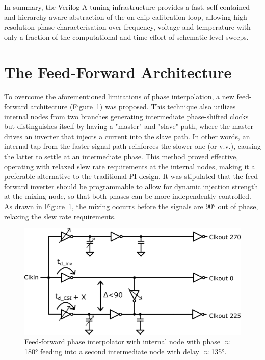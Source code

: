 \vspace{1em}
In summary, the Verilog-A tuning infrastructure provides a fast,
self-contained and hierarchy-aware abstraction of the on-chip calibration loop,
allowing high-resolution phase characterisation over frequency, voltage and
temperature with only a fraction of the computational and time effort of schematic-level
sweeps.

\section{The Feed-Forward Architecture}\label{sec:feedforward}
To overcome the aforementioned limitations of phase interpolation, a new feed-forward architecture (Figure~\ref{fig:FF_half_1}) was proposed. This technique also utilizes internal nodes from two branches generating intermediate phase-shifted clocks but distinguishes itself by having a "master" and "slave" path, where the master drives an inverter that injects a current into the slave path. In other words, an internal tap from the faster signal path reinforces the slower one (or v.v.), causing the latter to settle at an intermediate phase. This method proved effective, operating with relaxed slew rate requirements at the internal nodes, making it a preferable alternative to the traditional PI design. It was stipulated that the feed-forward inverter should be programmable to allow for dynamic injection strength at the mixing node, so that both phases can be more independently controlled. As drawn in Figure~\ref{fig:FF_half_1}, the mixing occurrs before the signals are \ang{90} out of phase, relaxing the slew rate requirements.

\begin{figure}[H]
  \centering
  \includegraphics[width=0.8\linewidth]{figures/Schematics/ff_csi_3out.png}
  \caption{Feed-forward phase interpolator with internal node with phase $\approx$\ang{180} feeding into a second intermediate node with delay  $\approx$\ang{135}.}
  \label{fig:FF_half_1}
\end{figure}

